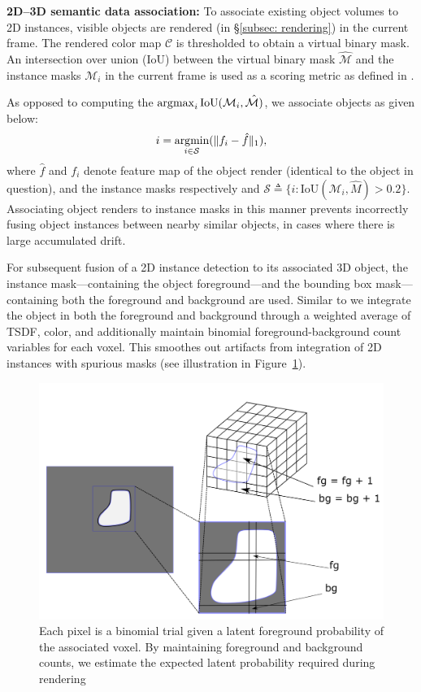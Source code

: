 \textbf{2D--3D semantic data association:}
To associate existing object volumes to 2D instances, visible objects are rendered (in \S\ref{subsec: rendering}) in the current frame. The rendered color map $\mathcal{C}$ is thresholded to obtain a virtual binary mask. An intersection over union (IoU) between the virtual binary mask $\hat{\mathcal{M}}$ and the instance masks $\mathcal{M}_i$ in the current frame is used as a scoring metric as defined in \cite{mccormacFusionVolumetricObjectLevel2018}.

As opposed to computing the $\operatorname*{\arg\!\max}_{i}{\text{IoU}(\mathcal{M}_i, \hat{\mathcal{M})}}$, we associate objects as given below:
\begin{align}
    i = \operatorname*{\arg\!\min}_{i \in \mathcal{S}} (\| f_i - \hat{f} \|_1),
\end{align}
where $\hat{f}$ and $f_i$ denote feature map of the object render (identical to the object in question), and the instance masks respectively and $\mathcal{S} \triangleq \{i : \text{IoU}(\mathcal{M}_i, \hat{M}) > 0.2\}$.
Associating object renders to instance masks in this manner prevents incorrectly fusing object instances between nearby similar objects, in cases where there is large accumulated drift.


For subsequent fusion of a 2D instance detection to its associated 3D object, the instance mask---containing the object foreground---and the bounding box mask---containing both the foreground and background are used. Similar to \cite{mccormacFusionVolumetricObjectLevel2018} we integrate the object in both the foreground and background through a weighted average of TSDF, color, and additionally maintain binomial foreground-background count variables for each voxel. This smoothes out artifacts from integration of 2D instances with spurious masks (see illustration in Figure~\ref{fig:object-integration}).

\begin{figure}[htpb]
    \centering
    \includegraphics[width=0.8\linewidth]{figs/object-integration.png}
    \caption{Each pixel is a binomial trial given a latent foreground probability of the associated voxel. By maintaining foreground and background counts, we estimate the expected latent probability required during rendering}%
    \label{fig:object-integration}
\end{figure}

